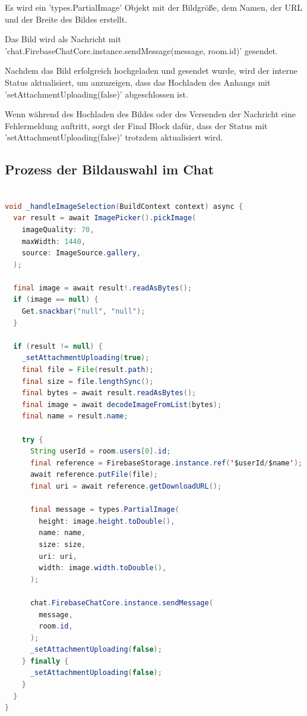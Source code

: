 Es wird ein 'types.PartialImage' Objekt mit der Bildgröße, dem Namen, der URL und der Breite des Bildes erstellt.

Das Bild wird als Nachricht mit 'chat.FirebaseChatCore.instance.sendMessage(message, room.id)' gesendet.

Nachdem das Bild erfolgreich hochgeladen und gesendet wurde, wird der interne Status aktualisiert, um anzuzeigen, dass das Hochladen des Anhangs mit 'setAttachmentUploading(false)' abgeschlossen ist.

Wenn während des Hochladen des Bildes oder des Versenden der Nachricht eine Fehlermeldung auftritt, sorgt der Final Block dafür, dass der Status mit 'setAttachmentUploading(false)' trotzdem aktualisiert wird.


\subsection{Prozess der Bildauswahl im Chat}

\begin{lstlisting}[language=Java,caption=Prozess der Bildauswahl und -verarbeitung,label=lst:fotoSelektion]  

void _handleImageSelection(BuildContext context) async {
  var result = await ImagePicker().pickImage(
    imageQuality: 70,
    maxWidth: 1440,
    source: ImageSource.gallery,
  );

  final image = await result!.readAsBytes();
  if (image == null) {
    Get.snackbar("null", "null");
  }

  if (result != null) {
    _setAttachmentUploading(true);
    final file = File(result.path);
    final size = file.lengthSync();
    final bytes = await result.readAsBytes();
    final image = await decodeImageFromList(bytes);
    final name = result.name;

    try {
      String userId = room.users[0].id;
      final reference = FirebaseStorage.instance.ref('$userId/$name');
      await reference.putFile(file);
      final uri = await reference.getDownloadURL();

      final message = types.PartialImage(
        height: image.height.toDouble(),
        name: name,
        size: size,
        uri: uri,
        width: image.width.toDouble(),
      );

      chat.FirebaseChatCore.instance.sendMessage(
        message,
        room.id,
      );
      _setAttachmentUploading(false);
    } finally {
      _setAttachmentUploading(false);
    }
  }
}

\end{lstlisting}

